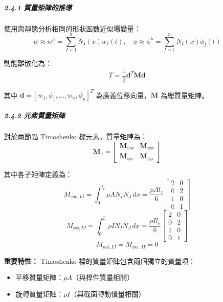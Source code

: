 ﻿\documentclass[UTF8, a4paper, 12pt]{ctexart}
\begin{document}
\subparagraph{2.4.1 質量矩陣的推導}

使用與靜態分析相同的形狀函數近似場變量：
\begin{equation}
  w \approx w^h = \sum_{I=1}^{n} N_I(x) w_I(t), \quad \phi \approx \phi^h = \sum_{I=1}^{n} N_I(x) \phi_I(t)
\end{equation}

動能離散化為：
\begin{equation}
  T = \frac{1}{2} \mathbf{{d}}^T \mathbf{M} \mathbf{{d}}
\end{equation}

其中 $\mathbf{d} = [w_1, \phi_1, \dots, w_n, \phi_n]^T$ 為廣義位移向量，$\mathbf{M}$ 為總質量矩陣。

\subparagraph{2.4.2 元素質量矩陣}

對於兩節點 Timoshenko 樑元素，質量矩陣為：
\begin{equation}
  \mathbf{M}_e = 
  \begin{bmatrix}
    \mathbf{M}_{ww} & \mathbf{M}_{w\phi} \\
    \mathbf{M}_{\phi w} & \mathbf{M}_{\phi\phi}
  \end{bmatrix}
\end{equation}

其中各子矩陣定義為：
\begin{equation}
  M_{ww,IJ} = \int_0^{l_e} \rho A N_I N_J \, dx = \frac{\rho A l_e}{6}
  \begin{bmatrix}
    2 & 0 \\
    0 & 2 \\
    1 & 0 \\
    0 & 1
  \end{bmatrix}
\end{equation}
\begin{equation}
  M_{\phi\phi,IJ} = \int_0^{l_e} \rho I N_I N_J \, dx = \frac{\rho I l_e}{6}
  \begin{bmatrix}
    2 & 0 \\
    0 & 2 \\
    1 & 0 \\
    0 & 1
  \end{bmatrix}
\end{equation}
\begin{equation}
  M_{w\phi,IJ} = M_{\phi w,JI} = 0
\end{equation}

\textbf{重要特性：} Timoshenko 樑的質量矩陣包含兩個獨立的質量項：
\begin{itemize}
  \item 平移質量矩陣：$\rho A$（與桿件質量相關）
  \item 旋轉質量矩陣：$\rho I$（與截面轉動慣量相關）
\end{itemize}
\end{document}
